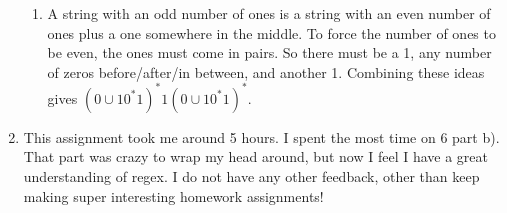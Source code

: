 \documentclass[12pt]{article}
\theoremstyle{definition}
\theoremstyle{remark}
\newcommand\setItemnumber[1]{\setcounter{enumi}{\numexpr#1-1\relax}}
\begin{document}
\begin{enumerate}[leftmargin=\labelsep]
\begin{enumerate}
			\item A string with an odd number of ones is a string with an even number of ones plus a one somewhere in the middle. To force the number of ones to be even, the ones must come in pairs. So there must be a 1, any number of zeros before/after/in between, and another 1. Combining these ideas gives
			$(0 \cup 10^*1)^*1(0 \cup 10^*1)^*$.
		\end{enumerate}

		\newpage
		\setItemnumber{8}
		\item This assignment took me around 5 hours. I spent the most time on 6 part b). That part was crazy to wrap my head around, but now I feel I have a great understanding of regex. I do not have any other feedback, other than keep making super interesting homework assignments!
	\end{enumerate}
\end{document}
